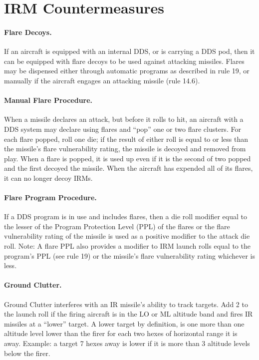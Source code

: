\section{IRM Countermeasures}

\paragraph{Flare Decoys.} If an aircraft is equipped with an internal DDS, or is carrying a DDS pod, then it can be equipped with flare decoys to be used against attacking missiles. Flares may be dispensed either through automatic programs as described in rule 19, or manually if the aircraft engages an attacking missile (rule 14.6).

\paragraph{Manual Flare Procedure.} When a missile declares an attack, but before it rolls to hit, an aircraft with a DDS system may declare using flares and “pop” one or two flare clusters. For each flare popped, roll one die; if the result of either roll is equal to or less than the missile's flare vulnerability rating, the missile is decoyed and removed from play. When a flare is popped, it is used up even if it is the second of two popped and the first decoyed the missile. When the aircraft has expended all of its flares, it can no longer decoy IRMs.

\paragraph{Flare Program Procedure.} If a DDS program is in use and includes flares, then a die roll modifier equal to the lesser of the Program Protection Level (PPL) of the flares or the flare vulnerability rating of the missile is used as a positive modifier to the attack die roll. Note: A flare PPL also provides a modifier to IRM launch rolls equal to the program's PPL (see rule 19) or the missile's flare vulnerability rating whichever is less.

\paragraph{Ground Clutter.}\label{rule:irm-ground-clutter} Ground Clutter interferes with an IR missile's ability to track targets. Add 2 to the launch roll if the firing aircraft is in the LO or ML altitude band and fires IR missiles at a “lower” target. A lower target by definition, is one more than one altitude level lower than the firer for each two hexes of horizontal range it is away. Example: a target 7 hexes away is lower if it is more than 3 altitude levels below the firer.

